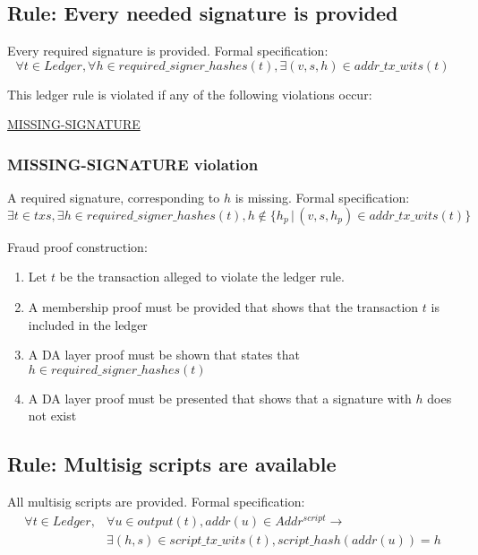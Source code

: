 \documentclass[../midgard.tex]{subfiles}
\begin{document}
\subsection{Rule: Every needed signature is provided}
\label{rule:every-needed-signature-is-provided}
Every required signature is provided.
Formal specification:
\begin{equation*}
    \forall t \in Ledger, \forall h \in required\_signer\_hashes(t), \exists (v, s, h) \in addr\_tx\_wits(t)
\end{equation*}
        
This ledger rule is violated if any of the following violations occur:
\begin{itemize-multi}
  \item \hyperref[violation:MISSING-SIGNATURE]{MISSING-SIGNATURE}
\end{itemize-multi}

\subsubsection{MISSING-SIGNATURE violation}
\label{violation:MISSING-SIGNATURE}
A required signature, corresponding to $h$ is missing.
Formal specification:
\begin{equation*}
    \exists t \in txs, \exists h \in required\_signer\_hashes(t), h \notin \{ h_p \, | \, (v, s, h_p) \in addr\_tx\_wits(t) \}
\end{equation*}

Fraud proof construction:
\begin{enumerate}
  \item Let $t$ be the transaction alleged to violate the ledger rule. 
  \item A membership proof must be provided that shows that the transaction $t$ is included in the ledger
  \item A DA layer proof must be shown that states that $h \in required\_signer\_hashes(t)$
  \item A DA layer proof must be presented that shows that a signature with $h$ does not exist
\end{enumerate}

\subsection{Rule: Multisig scripts are available}
\label{rule:multisig-scripts-are-available}
All multisig scripts are provided.
Formal specification:
\begin{equation*}
\begin{split}
  \forall t \in Ledger, & \forall u \in output(t), addr(u) \in Addr^{script} \rightarrow \\
  & \exists (h, s) \in script\_tx\_wits(t), script\_hash(addr(u)) = h
\end{split}
\end{equation*}
\end{document}
